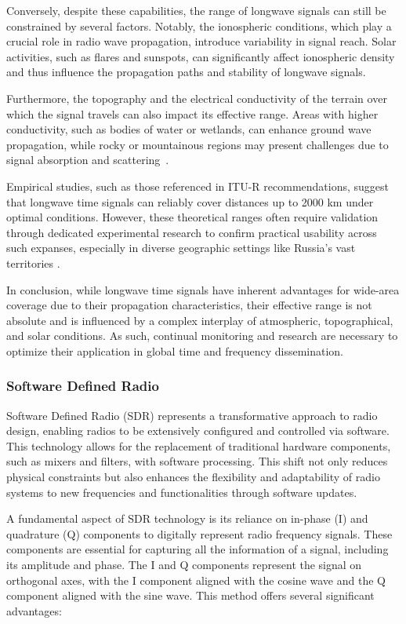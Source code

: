 \documentclass[12pt, a4paper]{extarticle}
\begin{document}
Conversely, despite these capabilities, the range of longwave signals can still be
constrained by several factors. Notably, the ionospheric conditions, which play
a crucial role in radio wave propagation, introduce variability in signal
reach. Solar activities, such as flares and sunspots, can significantly affect
ionospheric density and thus influence the propagation paths and stability of
longwave signals.

Furthermore, the topography and the electrical conductivity of the terrain over
which the signal travels can also impact its effective range. Areas with higher
conductivity, such as bodies of water or wetlands, can enhance ground wave
propagation, while rocky or mountainous regions may present challenges due to
signal absorption and scattering~\cite{longwave1,longwave2}.

Empirical studies, such as those referenced in ITU-R recommendations, suggest
that longwave time signals can reliably cover distances up to 2000 km under
optimal conditions. However, these theoretical ranges often require validation
through dedicated experimental research to confirm practical usability across
such expanses, especially in diverse geographic settings like Russia's vast
territories \cite{itur1997standard}.

In conclusion, while longwave time signals have inherent advantages for
wide-area coverage due to their propagation characteristics, their effective
range is not absolute and is influenced by a complex interplay of atmospheric,
topographical, and solar conditions. As such, continual monitoring and research
are necessary to optimize their application in global time and frequency
dissemination.

\subsubsection{Software Defined Radio}

Software Defined Radio (SDR) represents a transformative approach to radio
design, enabling radios to be extensively configured and controlled via
software. This technology allows for the replacement of traditional hardware
components, such as mixers and filters, with software processing. This shift
not only reduces physical constraints but also enhances the flexibility and
adaptability of radio systems to new frequencies and functionalities through
software updates.

A fundamental aspect of SDR technology is its reliance on in-phase (I) and
quadrature (Q) components to digitally represent radio frequency signals. These
components are essential for capturing all the information of a signal,
including its amplitude and phase. The I and Q components represent the signal
on orthogonal axes, with the I component aligned with the cosine wave and the Q
component aligned with the sine wave. This method offers several significant
advantages:
\end{document}
